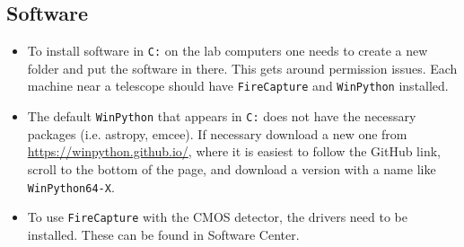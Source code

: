 \documentclass[11pt]{article}
\begin{document}
\subsection{Software}

\begin{itemize}
    \item To install software in \texttt{C:} on the lab computers one needs to create a new folder and put the software in there. This gets around permission issues. Each machine near a telescope should have \texttt{FireCapture} and \texttt{WinPython} installed.

    \item The default \texttt{WinPython} that appears in \texttt{C:} does not have the necessary packages (i.e. astropy, emcee). If necessary download a new one from \href{https://winpython.github.io/}{https://winpython.github.io/}, where it is easiest to follow the GitHub link, scroll to the bottom of the page, and download a version with a name like \texttt{WinPython64-X}.

    \item To use \texttt{FireCapture} with the CMOS detector, the drivers need to be installed. These can be found in Software Center.
\end{itemize}

\clearpage



\end{document}
